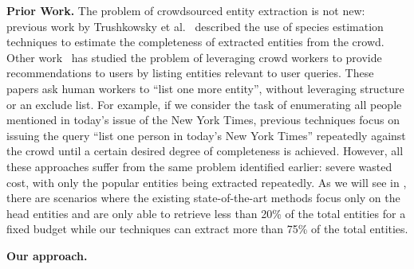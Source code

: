 \noindent
{\bf Prior Work.}
The problem of crowdsourced entity extraction is not new: previous work by Trushkowsky et al.~\cite{trushkowsky:2013}
described the use of species estimation techniques to estimate the completeness of extracted entities from the crowd. 
Other work~\cite{amsterdamer:2014} has studied the problem of leveraging crowd workers to provide recommendations to users by listing entities relevant to user queries. These papers ask human workers to ``list one more entity'', without leveraging structure or an exclude list. For example, if we consider the task of enumerating all people mentioned in today's issue of the New York Times, previous techniques focus on issuing the query ``list one person in today's New York Times'' repeatedly against the crowd until a certain desired degree of completeness is achieved.
However, all these approaches suffer from the same problem identified earlier: severe wasted cost,
with only the popular entities being extracted repeatedly. As we will see in , there are scenarios where the existing state-of-the-art methods focus only on the head entities and are only able to retrieve less than 20\% of the total entities for a fixed budget while our techniques can extract more than 75\% of the total entities.

\noindent
{\bf Our approach.} 


